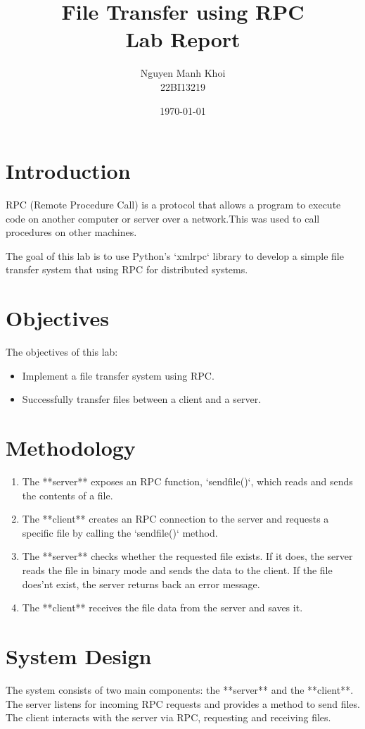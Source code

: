 \documentclass[a4paper,12pt]{article}
\title{File Transfer using RPC\\ \large Lab Report}
\author{Nguyen Manh Khoi \\ 22BI13219}
\date{\today}
\begin{document}
\maketitle

\section{Introduction}
RPC (Remote Procedure Call) is a protocol that allows a program to execute code on another computer or server over a network.This was used to call procedures on other machines.

The goal of this lab is to use Python's `xmlrpc` library to develop a simple file transfer system that  using RPC for distributed systems.

\section{Objectives}
The objectives of this lab:
\begin{itemize}
    \item Implement a file transfer system using RPC.
    \item Successfully transfer files between a client and a server.
\end{itemize}

\section{Methodology}


\begin{enumerate}
    \item The **server** exposes an RPC function, `sendfile()`, which reads and sends the contents of a file.
    \item The **client** creates an RPC connection to the server and requests a specific file by calling the `sendfile()` method.
    \item The **server** checks whether the requested file exists. If it does, the server reads the file in binary mode and sends the data to the client. If the file does'nt exist, the server returns back an error message.
    \item The **client** receives the file data from the server and saves it.
\end{enumerate}

\section{System Design}
The system consists of two main components: the **server** and the **client**. The server listens for incoming RPC requests and provides a method to send files. The client interacts with the server via RPC, requesting and receiving files.
\end{document}
